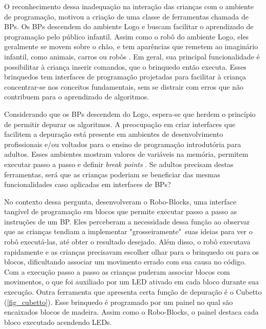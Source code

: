 O reconhecimento dessa inadequação na interação das crianças com o ambiente de programação, motivou a criação de uma classe de ferramentas chamada de \ac{BPs}. Os \ac{BPs} descendem do ambiente Logo e buscam facilitar o aprendizado de programação pelo público infantil. Assim como o robô do ambiente Logo, eles geralmente se movem sobre o chão, e tem aparências que remetem ao imaginário infantil, como animais, carros ou robôs \cite{raabe_2017_rope}. Em geral, sua principal funcionalidade é possibilitar à criança inserir comandos, que o brinquedo então executa. Esses brinquedos tem interfaces de programação projetadas para facilitar à criança concentrar-se nos conceitos fundamentais, sem se distrair com erros que não contribuem para o aprendizado de algoritmos.

Considerando que os \ac{BPs} descendem do Logo, espera-se que herdem o princípio de permitir depurar os algoritmos. A preocupação em criar interfaces que facilitem a depuração está presente em ambientes de desenvolvimento profissionais e/ou voltados para o ensino de programação introdutória para adultos. Esses ambientes mostram valores de variáveis na memória, permitem executar passo a passo e definir \textit{break points} \cite{noschang_portugol_nodate}. Se adultos precisam destas ferramentas, será que as crianças poderiam se beneficiar das mesmas funcionalidades caso aplicadas em interfaces de \ac{BPs}?

No contexto dessa pergunta,  desenvolveram o Robo-Blocks, uma interface tangível de programação em blocos que permite executar passo a passo as instruções de um BP. Eles perceberam a necessidade dessa função ao observar que as crianças tendiam a implementar "grosseiramente"\ suas ideias para ver o robô executá-las, até obter o resultado desejado. Além disso, o robô executava rapidamente e as crianças precisavam escolher olhar para o brinquedo ou para os blocos, dificultando associar um movimento errado com sua causa no código. Com a execução passo a passo as crianças puderam associar blocos com movimentos, o que foi auxiliado por um LED ativado em cada bloco durante sua execução. Outra ferramenta que apresenta certa função de depuração é o Cubetto \cite{anzoategui_cubetto_2017} (\autoref{fig_cubetto}).  Esse brinquedo é programado por um painel no qual são encaixados blocos de madeira. Assim como o Robo-Blocks, o painel destaca cada bloco executado acendendo LEDs.

